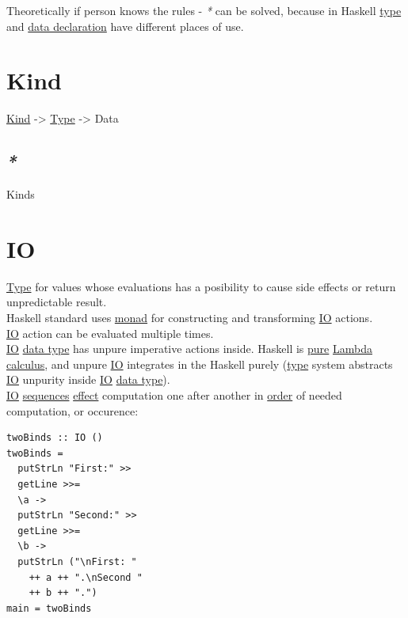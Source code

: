 \documentclass[a4paper,14pt,oneside]{book}
\begin{document}
Theoretically if person knows the rules - \emph{*} can be solved, because in Haskell \hyperref[orgb064f4e]{type} and \hyperref[org8c00f7f]{data declaration} have different places of use.\\

\section{\label{org0c80090}Kind}
\label{sec:orgcb09dcf}
\hyperref[org0c80090]{Kind} -> \hyperref[orgb064f4e]{Type} -> Data\\

\subsection{\emph{*}}
\label{sec:org503e289}

\label{org65bb192}Kinds\\

\section{\label{org056a21a}IO}
\label{sec:org686ec3b}
\hyperref[orgb064f4e]{Type} for values whose evaluations has a posibility to cause side effects or return unpredictable result.\\
Haskell standard uses \hyperref[orgdc7b1f8]{monad} for constructing and transforming \hyperref[org056a21a]{IO} actions.\\
\hyperref[org056a21a]{IO} action can be evaluated multiple times.\\

\hyperref[org056a21a]{IO} \hyperref[org5a3f461]{data type} has unpure imperative actions inside. Haskell is \hyperref[org5032341]{pure} \hyperref[org4a72ae8]{Lambda calculus}, and unpure \hyperref[org056a21a]{IO} integrates in the Haskell purely (\hyperref[orgb064f4e]{type} system abstracts \hyperref[org056a21a]{IO} unpurity inside \hyperref[org056a21a]{IO} \hyperref[org5a3f461]{data type}).\\

\hyperref[org056a21a]{IO} \hyperref[org4f333a5]{sequences} \hyperref[orgeaf52ac]{effect} computation one after another in \hyperref[org42483ff]{order} of needed computation, or occurence:\\

\begin{verbatim}
twoBinds :: IO ()
twoBinds =
  putStrLn "First:" >>
  getLine >>=
  \a ->
  putStrLn "Second:" >>
  getLine >>=
  \b ->
  putStrLn ("\nFirst: "
    ++ a ++ ".\nSecond "
    ++ b ++ ".")
main = twoBinds
\end{verbatim}
\end{document}
